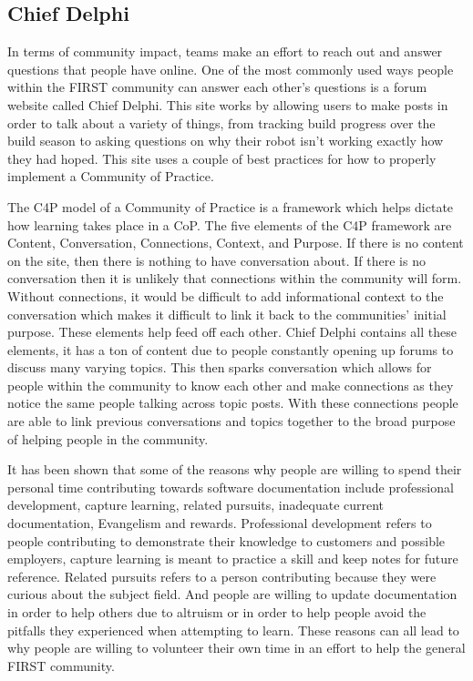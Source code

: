 \documentclass[10pt,twocolumn]{article}
\begin{document}
\subsection{Chief Delphi}

In terms of community impact, teams make an effort to reach out and answer questions that people have online. One of the most commonly used ways people within the FIRST community can answer each other's questions is a forum website called Chief Delphi. This site works by allowing users to make posts in order to talk about a variety of things, from tracking build progress over the build season to asking questions on why their robot isn't working exactly how they had hoped. This site uses a couple of best practices for how to properly implement a Community of Practice. 

The C4P model of a Community of Practice is a framework which helps dictate how learning takes place in a CoP\cite{hoadley_using_2005}. The five elements of the C4P framework are Content, Conversation, Connections, Context, and Purpose. If there is no content on the site, then there is nothing to have conversation about. If there is no conversation then it is unlikely that connections within the community will form. Without connections, it would be difficult to add informational context to the conversation which makes it difficult to link it back to the communities' initial purpose. These elements help feed off each other. Chief Delphi contains all these elements, it has a ton of content due to people constantly opening up forums to discuss many varying topics. This then sparks conversation which allows for people within the community to know each other and make connections as they notice the same people talking across topic posts. With these connections people are able to link previous conversations and topics together to the broad purpose of helping people in the community. 

It has been shown that some of the reasons why people are willing to spend their personal time contributing towards software documentation include professional development, capture learning, related pursuits, inadequate current documentation, Evangelism and rewards\cite{arya_why_2024}. Professional development refers to people contributing to demonstrate their knowledge to customers and possible employers, capture learning is meant to practice a skill and keep notes for future reference. Related pursuits refers to a person contributing because they were curious about the subject field. And people are willing to update documentation in order to help others due to altruism or in order to help people avoid the pitfalls they experienced when attempting to learn\cite{arya_why_2024}. These reasons can all lead to why people are willing to volunteer their own time in an effort to help the general FIRST community.
\end{document}
